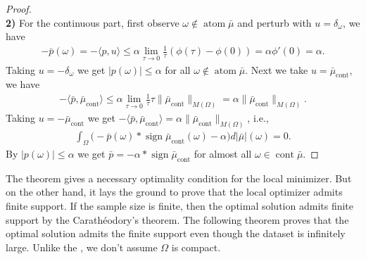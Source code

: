 \documentclass[12pt,fleqn]{amsart}
\theoremstyle{definition}
\DeclareMathOperator*{\atom}{atom}
\DeclareMathOperator*{\cont}{cont}
\DeclareMathOperator*{\sign}{sign}
\begin{document}
\begin{proof}
\quad\\
\textbf{2)} For the continuous part, first observe $\omega \notin \atom \bar{\mu}$ and perturb with $ u = \delta_\omega$, we have
\begin{align*}
	-\bar{p}(\omega) =  - \langle p, u \rangle \le \alpha \lim_{\tau \rightarrow 0 } \frac{1}{\tau} ( \phi(\tau) - \phi(0) ) = \alpha \phi'(0) = \alpha.
\end{align*}
Taking $u = - \delta_\omega$ we get $|p(\omega)| \le \alpha$ for all $\omega \notin \atom \bar{\mu}$.
Next we take $u = \bar{\mu}_{\text{cont}}$, we have
\begin{align*}
	-\langle \bar{p}, \bar{\mu}_{\text{cont}} \rangle \le \alpha \lim_{\tau \rightarrow 0} \frac{1}{\tau} \tau  \|\bar{\mu}_{\text{cont}}\|_{M(\Omega)} =  \alpha \|\bar{\mu}_{\text{cont}}\|_{M(\Omega)}.
\end{align*}
Taking $u = - \bar{\mu}_{\text{cont}}$ we get $-\langle \bar{p}, \bar{\mu}_{\text{cont}} \rangle  = \alpha \|\bar{\mu}_{\text{cont}}\|_{M(\Omega)}$, i.e., 
\begin{align*}
	\int_\Omega \bigg( - \bar{p}(\omega) * \sign \bar{\mu}_{\cont} (\omega)  - \alpha \bigg) d|\bar{\mu}|(\omega) = 0. 
\end{align*}
By $|p(\omega)| \le \alpha$ we get $\bar{p} =  - \alpha *  \sign \bar{\mu}_{\cont}$ for almost all $\omega \in \cont \bar{\mu}$. 
\end{proof}

The theorem gives a necessary optimality condition for the local minimizer. 
But on the other hand, it lays the ground to prove that the local optimizer admits finite support. 
If the sample size is finite, then the optimal solution admits finite support by the Carath\'eodory's theorem. 
The following theorem proves that the optimal solution admits the finite support even though the dataset is infinitely large. 
Unlike the \cite{pieper2022nonconvex}, we don't assume $\Omega$ is compact. 
\end{document}
